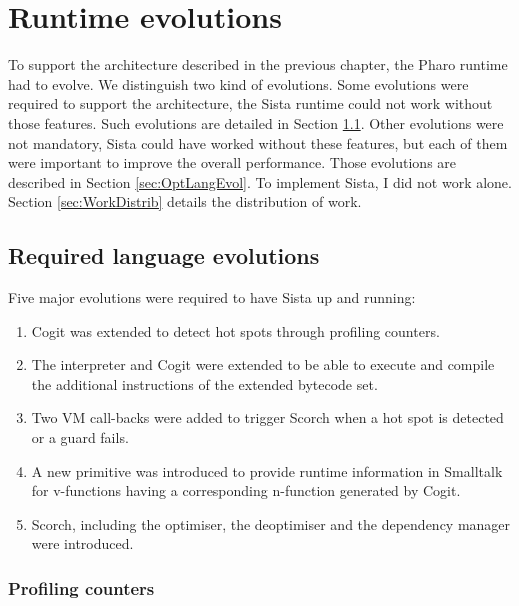 \documentclass[a4paper,12pt,twoside]{../includes/ThesisStyle}
\begin{document}
\fi

\chapter{Runtime evolutions}
\label{chap:runtimeEvolution}
\minitoc

To support the architecture described in the previous chapter, the Pharo runtime had to evolve. We distinguish two kind of evolutions. Some evolutions were required to support the architecture, the Sista runtime could not work without those features. Such evolutions are detailed in Section \ref{sec:ReqLangEvol}. Other evolutions were not mandatory, Sista could have worked without these features, but each of them were important to improve the overall performance. Those evolutions are described in Section \ref{sec:OptLangEvol}. To implement Sista, I did not work alone. Section \ref{sec:WorkDistrib} details the distribution of work.


\section{Required language evolutions}
\label{sec:ReqLangEvol}

Five major evolutions were required to have Sista up and running:
\begin{enumerate}
	\item Cogit was extended to detect hot spots through profiling counters.
	\item The interpreter and Cogit were extended to be able to execute and compile the additional instructions of the extended bytecode set.
	\item Two VM call-backs were added to trigger Scorch when a hot spot is detected or a guard fails.
	\item A new primitive was introduced to provide runtime information in Smalltalk for v-functions having a corresponding n-function generated by Cogit.
	\item Scorch, including the optimiser, the deoptimiser and the dependency manager were introduced.
\end{enumerate}

\subsection{Profiling counters}
\end{document}
